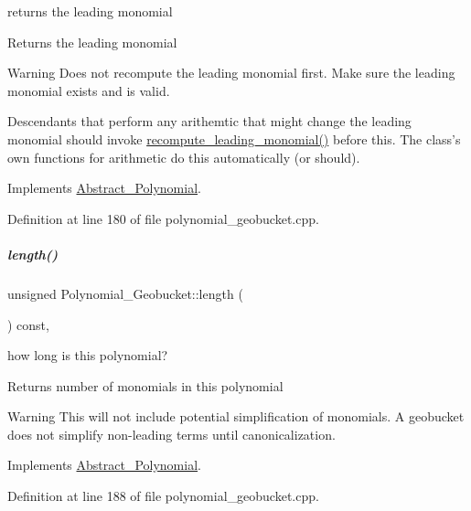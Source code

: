 returns the leading monomial 

\begin{DoxyReturn}{Returns}
the leading monomial 
\end{DoxyReturn}
\begin{DoxyWarning}{Warning}
Does not recompute the leading monomial first. Make sure the leading monomial exists and is valid. 

Descendants that perform any arithemtic that might change the leading monomial should invoke \hyperlink{group__polygroup_ab57dbe8d5f0d3860997775d9f354ab0c}{recompute\+\_\+leading\+\_\+monomial()} before this. The class's own functions for arithmetic do this automatically (or should). 
\end{DoxyWarning}


Implements \hyperlink{group__polygroup_a9186ed0f55c5cc4ecb1b9bc11ba9f679}{Abstract\+\_\+\+Polynomial}.



Definition at line 180 of file polynomial\+\_\+geobucket.\+cpp.

\mbox{\label{group__polygroup_a691f704d695210841a60fe2e6791d1af}} 
\subparagraph{\texorpdfstring{length()}{length()}}
{\footnotesize\ttfamily unsigned Polynomial\+\_\+\+Geobucket\+::length (\begin{DoxyParamCaption}{ }\end{DoxyParamCaption}) const\hspace{0.3cm}{\ttfamily [override]}, {\ttfamily [virtual]}}



how long is this polynomial? 

\begin{DoxyReturn}{Returns}
number of monomials in this polynomial 
\end{DoxyReturn}
\begin{DoxyWarning}{Warning}
This will not include potential simplification of monomials. A geobucket does not simplify non-\/leading terms until canonicalization. 
\end{DoxyWarning}


Implements \hyperlink{group__polygroup_a48f4c3c030ca66a9386cd71f71d5def7}{Abstract\+\_\+\+Polynomial}.



Definition at line 188 of file polynomial\+\_\+geobucket.\+cpp.

